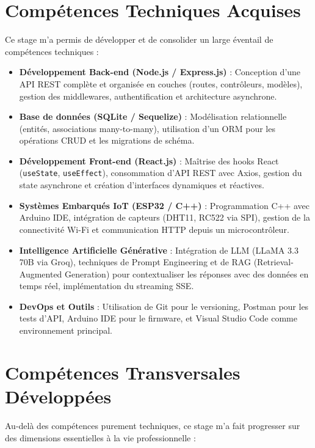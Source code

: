 \documentclass[12pt,a4paper]{report}
\begin{document}
\section{Compétences Techniques Acquises}
Ce stage m'a permis de développer et de consolider un large éventail de compétences techniques :
\begin{itemize}
    \item \textbf{Développement Back-end (Node.js / Express.js)} : Conception d'une API REST complète et organisée en couches (routes, contrôleurs, modèles), gestion des middlewares, authentification et architecture asynchrone.
    \item \textbf{Base de données (SQLite / Sequelize)} : Modélisation relationnelle (entités, associations many-to-many), utilisation d'un ORM pour les opérations CRUD et les migrations de schéma.
    \item \textbf{Développement Front-end (React.js)} : Maîtrise des hooks React (\texttt{useState}, \texttt{useEffect}), consommation d'API REST avec Axios, gestion du state asynchrone et création d'interfaces dynamiques et réactives.
    \item \textbf{Systèmes Embarqués IoT (ESP32 / C++)} : Programmation C++ avec Arduino IDE, intégration de capteurs (DHT11, RC522 via SPI), gestion de la connectivité Wi-Fi et communication HTTP depuis un microcontrôleur.
    \item \textbf{Intelligence Artificielle Générative} : Intégration de LLM (LLaMA 3.3 70B via Groq), techniques de Prompt Engineering et de RAG (Retrieval-Augmented Generation) pour contextualiser les réponses avec des données en temps réel, implémentation du streaming SSE.
    \item \textbf{DevOps et Outils} : Utilisation de Git pour le versioning, Postman pour les tests d'API, Arduino IDE pour le firmware, et Visual Studio Code comme environnement principal.
\end{itemize}

\section{Compétences Transversales Développées}
Au-delà des compétences purement techniques, ce stage m'a fait progresser sur des dimensions essentielles à la vie professionnelle :
\end{document}
